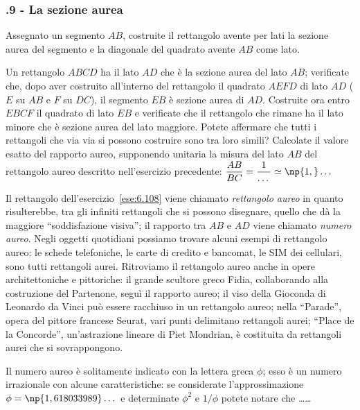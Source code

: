 \subsubsection*{\thechapter.9 - La sezione aurea}

\begin{esercizio}
\label{ese:6.107}
Assegnato un segmento $AB$, costruite il rettangolo avente per lati la sezione aurea del segmento e la diagonale del quadrato avente $AB$ come lato.
\end{esercizio}

\begin{esercizio}
\label{ese:6.108}
Un rettangolo $ABCD$ ha il lato $AD$ che è la sezione aurea del lato $AB$; verificate che, dopo aver costruito all'interno del rettangolo il quadrato $AEFD$ di lato $AD$ ($E$ su $AB$ e $F$ su $DC$), il segmento $EB$ è sezione aurea di $AD$. Costruite ora entro $EBCF$ il quadrato di lato $EB$ e verificate che il rettangolo che rimane ha il lato minore che è sezione aurea del lato maggiore. Potete affermare che tutti i rettangoli che via via si possono costruire sono tra loro simili? Calcolate il valore esatto del rapporto aureo, supponendo unitaria la misura del lato $AB$ del rettangolo aureo descritto nell'esercizio precedente: $\dfrac{AB}{BC}=\dfrac{1}{\ldots{}}\simeq \np{1,}\ldots{}$
\end{esercizio}

Il rettangolo dell'esercizio~\ref{ese:6.108} viene chiamato \emph{rettangolo aureo} in quanto risulterebbe, tra gli infiniti rettangoli che si possono disegnare, quello che dà la maggiore ``soddisfazione visiva''; il rapporto tra $AB$ e $AD$ viene chiamato \emph{numero aureo}. 
Negli oggetti quotidiani possiamo trovare alcuni esempi di rettangolo aureo: le schede telefoniche, le carte di credito e bancomat, le SIM dei cellulari, sono tutti rettangoli aurei.
Ritroviamo il rettangolo aureo anche in opere architettoniche e pittoriche: il grande scultore greco Fidia, collaborando alla costruzione del Partenone, seguì il rapporto aureo; il viso della Gioconda di Leonardo da Vinci può essere racchiuso in un rettangolo aureo; nella ``Parade'', opera del pittore francese Seurat, vari punti delimitano rettangoli aurei; ``Place de la Concorde'', un'astrazione lineare di Piet Mondrian, è costituita da rettangoli aurei che si sovrappongono.

\begin{esercizio}
\label{ese:6.109}
Il numero aureo è solitamente indicato con la lettera greca $\phi$; esso è un numero irrazionale con alcune caratteristiche: se considerate l'approssimazione $\phi=\np{1,618033989}\ldots{}$ e determinate $\phi^2$ e $1/\phi$ potete notare che \ldots\ldots{}
\end{esercizio}

